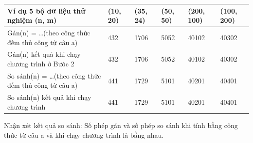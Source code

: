 \documentclass[12pt, letterpaper]{article}
\begin{document}
  \pagebreak
  \begin{center}
  	\begin{tabular}{| m{10em} | m{1.5cm}| m{1.5cm} | m{1.5cm} | m{2cm} | m{2cm} |} 
  		\hline
  		Ví dụ 5 bộ dữ liệu thử nghiệm (n, m) & (10, 20) & (35, 24) & (50, 50) & (200, 100) & (100, 200) \\
  		\hline
  		Gán(n) = …(theo công thức đếm thủ công từ câu a) & 432 & 1706 & 5052 &	40102 &	40302 \\
  		\hline
  		Gán(n) kết quả khi chạy chương trình ở Bước 2 & 432 & 1706 & 5052 &	40102 &	40302 \\ 
  		\hline
  		So sánh(n) = …(theo  công thức đếm thủ công từ câu a) & 441	& 1729	& 5101	& 40201	& 40401 \\
  		\hline
  		So sánh(n) kết quả khi chạy chương trình & 441	& 1729	& 5101	& 40201	& 40401 \\
  		\hline
  	\end{tabular}
  \end{center}
  
  \noindent Nhận xét kết quả so sánh: Số phép gán và số phép so sánh  khi tính bằng công thức từ câu a và khi chạy chương trình là bằng nhau.
\end{document}
